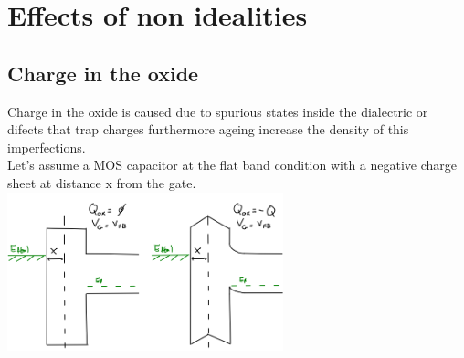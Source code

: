 \section{Effects of non idealities}

\subsection{Charge in the oxide}

Charge in the oxide is caused due to spurious states inside the dialectric or difects that trap charges furthermore ageing increase the density of this imperfections.\\
Let's assume a MOS capacitor at the flat band condition with a negative charge sheet at distance x from the gate.\\ 

\centering
\includegraphics[width=0.6\textwidth]{qinox.png}\\
\raggedright

